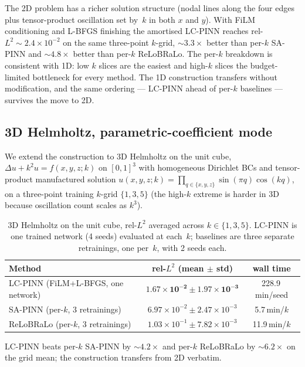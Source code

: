 \documentclass{article}
\theoremstyle{plain}
\theoremstyle{definition}
\theoremstyle{remark}
\begin{document}
The 2D problem has a richer solution structure (nodal lines along
the four edges plus tensor-product oscillation set by~$k$ in both
$x$ and $y$). With FiLM conditioning and L-BFGS finishing the
amortised LC-PINN reaches rel-$L^2 \!\sim\! 2.4 \times 10^{-2}$ on
the same three-point $k$-grid, $\sim\!3.3\times$ better than per-$k$
SA-PINN and $\sim\!4.8\times$ better than per-$k$ ReLoBRaLo. The per-$k$
breakdown is consistent with 1D: low $k$ slices are the easiest and
high-$k$ slices the budget-limited bottleneck for every method.
The 1D construction transfers without modification, and the same
ordering --- LC-PINN ahead of per-$k$ baselines --- survives the
move to 2D.

\subsection{3D Helmholtz, parametric-coefficient mode}
\label{sec:results-helmholtz-3d}

We extend the construction to 3D Helmholtz on the unit cube,
$\Delta u + k^2 u = f(x,y,z;k)$ on $[0,1]^3$ with homogeneous
Dirichlet BCs and tensor-product manufactured solution
$u(x,y,z;k) \!=\! \prod_{q\in\{x,y,z\}}\sin(\pi q)\cos(kq)$, on a
three-point training $k$-grid $\{1, 3, 5\}$ (the high-$k$ extreme
is harder in 3D because oscillation count scales as $k^3$).

\begin{table}[h]
\centering
\caption{3D Helmholtz on the unit cube, rel-$L^2$ averaged across
$k \in \{1, 3, 5\}$. LC-PINN is one trained network (4 seeds)
evaluated at each~$k$; baselines are three separate retrainings,
one per~$k$, with 2 seeds each.}
\label{tab:helmholtz-3d}
\begin{tabular}{lcc}
\toprule
Method & rel-$L^2$ (mean $\pm$ std) & wall time \\
\midrule
LC-PINN (FiLM+L-BFGS, one network) & $\mathbf{1.67 \times 10^{-2} \pm 1.97 \times 10^{-3}}$ & 228.9\,min/seed \\
SA-PINN (per-$k$, 3 retrainings)   & $6.97 \times 10^{-2} \pm 2.47 \times 10^{-3}$ & 5.7\,min/$k$ \\
ReLoBRaLo (per-$k$, 3 retrainings) & $1.03 \times 10^{-1} \pm 7.82 \times 10^{-3}$ & 11.9\,min/$k$ \\
\bottomrule
\end{tabular}
\end{table}

LC-PINN beats per-$k$ SA-PINN by $\sim\!4.2\times$ and per-$k$
ReLoBRaLo by $\sim\!6.2\times$ on the grid mean; the construction
transfers from 2D verbatim.
\end{document}
